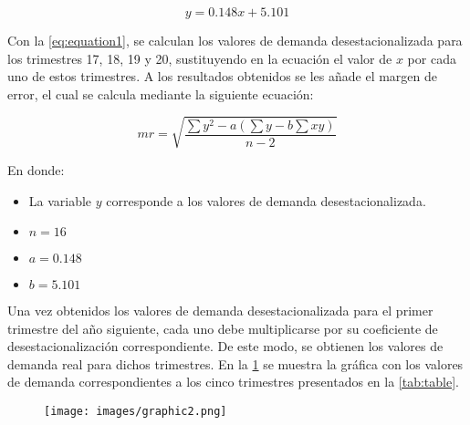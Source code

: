 \begin{equation}
    y = 0.148x + 5.101
    \label{eq:equation1}
\end{equation}

Con la \cref{eq:equation1}, se calculan los valores de demanda 
desestacionalizada para los trimestres 17, 18, 19 y 20, sustituyendo en la 
ecuación el valor de $x$ por cada uno de estos trimestres. A los resultados 
obtenidos se les añade el margen de error, el cual se calcula mediante la 
siguiente ecuación:

\begin{equation*}
    mr = \sqrt{\frac{\sum y^2 - a(\sum y - b\sum xy)}{n-2}}
\end{equation*}

En donde:
\begin{itemize}
    \item La variable $y$ corresponde a los valores de demanda desestacionalizada.
    \item $n = 16$
    \item $a = 0.148$
    \item $b = 5.101$
\end{itemize}

Una vez obtenidos los valores de demanda desestacionalizada para el primer 
trimestre del año siguiente, cada uno debe multiplicarse por su coeficiente de 
desestacionalización correspondiente. De este modo, se obtienen los valores de 
demanda real para dichos trimestres. En la \cref{fig:graphic2} se muestra la 
gráfica con los valores de demanda correspondientes a los cinco trimestres 
presentados en la \cref{tab:table}.
 
\begin{figure}[H]
    \centering
    \texttt{[image: images/graphic2.png]}
    \label{fig:graphic2}
\end{figure}

\begin{table*}[]
\label{tab:table}
\end{table*}
